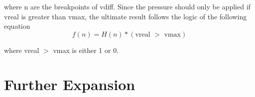 \par\noindent
where n are the breakpoints of vdiff. Since the pressure should only be applied if vreal is greater than vmax, the ultimate result follows the logic of the following equation \[
	f(n) = H(n) * (\text{vreal $>$ vmax})
\]

\par\noindent
where vreal $>$ vmax is either 1 or 0.

\section{Further Expansion}
\label{sec:FurtherExpansion}
